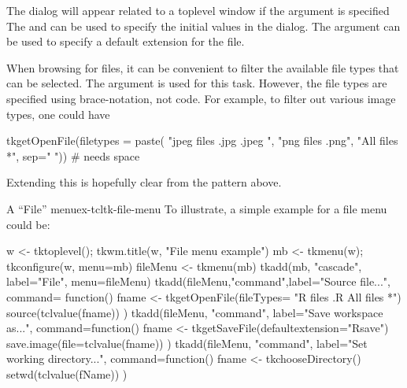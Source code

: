 The dialog will appear related to a toplevel window if the argument
 is specified The
 and
 can be used to specify the
initial values in the dialog.  The
 argument can be used to
specify a default extension for the file.

When browsing for files, it can be convenient to filter the available
file types that can be selected. The  argument is used for this task. However,
the file types are specified using \TCL\/ brace-notation, not \R\/ code. For example,
to filter out various image types, one could have 
\begin{Schunk}
\begin{Sinput}
 tkgetOpenFile(filetypes = paste(
                 "{{jpeg files} {.jpg .jpeg} }",
                 "{{png files} {.png}}",
                 "{{All files} {*}}", sep=" ")) # needs space
\end{Sinput}
\end{Schunk}
Extending this is hopefully clear from the pattern above.

\begin{example}{A ``File'' menu}{ex-tcltk-file-menu}
  To illustrate, a simple example for a file menu could be:
\begin{Schunk}
\begin{Sinput}
 w <- tktoplevel(); tkwm.title(w, "File menu example")
 mb <- tkmenu(w); tkconfigure(w, menu=mb)
 fileMenu <- tkmenu(mb)
 tkadd(mb, "cascade", label="File", menu=fileMenu)
 tkadd(fileMenu,"command",label="Source file...",
       command= function() {
         fname <- tkgetOpenFile(fileTypes=
                         "{{R files} {.R}} {{All files} *}")
         source(tclvalue(fname))
       })
 tkadd(fileMenu, "command", label="Save workspace as...",
       command=function() {
         fname <- tkgetSaveFile(defaultextension="Rsave")
         save.image(file=tclvalue(fname))
       })
 tkadd(fileMenu, "command", label="Set working directory...",
       command=function() {
         fname <- tkchooseDirectory()
         setwd(tclvalue(fName))
       })
\end{Sinput}
\end{Schunk}
\end{example}

